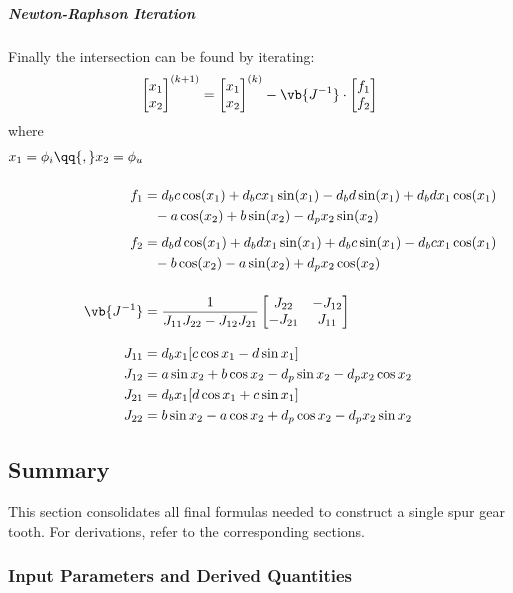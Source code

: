 \subparagraph{Newton-Raphson Iteration}
Finally the intersection can be found by iterating:
\begin{align}
    \begin{bmatrix}
        x_1 \\ x_2
    \end{bmatrix}^{(k+1)}
    =
    \begin{bmatrix}
        x_1 \\ x_2
    \end{bmatrix}^{(k)}
    - \vb{J^{-1}} \cdot \begin{bmatrix} f_1 \\ f_2 \end{bmatrix}
\end{align}
where
\begin{align}
    x_1 = \phi_i \qq{,} x_2=\phi_u \\[3ex]
    f_1 &= d_bc\cos(x_1) + d_bcx_1\sin(x_1) - d_bd\sin(x_1) + d_bdx_1\cos(x_1)\nonumber\\
        &\phantom{=}- a\cos(x_2) + b\sin(x_2) - d_px_2\sin(x_2)\\[1ex]
    f_2 &= d_bd\cos(x_1) + d_bdx_1\sin(x_1) + d_bc\sin(x_1) -d_bcx_1\cos(x_1)\nonumber\\
        &\phantom{=}-b\cos(x_2) - a \sin(x_2) + d_px_2\cos(x_2) \\[3ex]
    \vb {J^{-1}} &= \frac{1}{J_{11}J_{22} - J_{12}J_{21}}
        \begin{bmatrix}
            J_{22} & - J_{12} \\
            -J_{21} & J_{11}
        \end{bmatrix}\\[2ex]
    J_{11} &= d_bx_1[c\cos x_1 - d\sin x_1] \\
    J_{12} &= a\sin x_2 + b\cos x_2 - d_p \sin x_2 - d_px_2 \cos x_2  \\
    J_{21} &= d_bx_1[d\cos x_1 + c\sin x_1] \\
    J_{22} &= b\sin x_2 - a\cos x_2 + d_p\cos x_2 - d_px_2\sin x_2
\end{align}

\subsection{Summary}
\label{sec:spur_summary}
This section consolidates all final formulas needed to construct a single spur gear tooth. For derivations, refer to the corresponding sections.

\subsubsection{Input Parameters and Derived Quantities}

